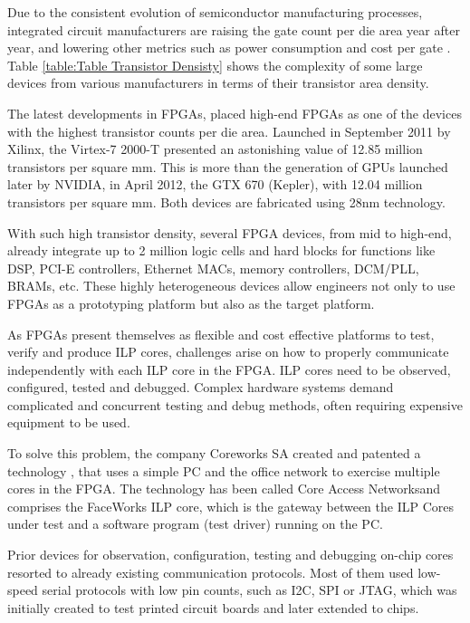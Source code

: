 \documentclass[defaultstyle,10pt,master,Helvetica]{thesis}
\begin{document}
Due to the consistent evolution of semiconductor manufacturing processes, integrated circuit manufacturers are raising the gate count per die area year after year, and lowering other metrics such as power consumption and cost per gate \cite[p. 24]{XilinxConsump}. Table \ref{table:Table Transistor Densisty} shows the complexity of some large devices from various manufacturers in terms of their transistor area density.

The latest developments in \acfp{FPGA}, placed high-end \acsp{FPGA} as one of the devices with the highest transistor counts per die area. Launched in September 2011 by Xilinx, the Virtex-7 2000-T presented an astonishing value of 12.85 million transistors per square mm. This is more than the generation of \acp{GPU} launched later by NVIDIA, in April 2012, the GTX 670 (Kepler), with 12.04 million transistors per square mm. Both devices are fabricated using 28nm technology.



With such high transistor density, several \ac{FPGA} devices, from mid to high-end, already integrate up to 2 million logic cells and hard blocks for functions like DSP, PCI-E controllers, Ethernet \acp{MAC}, memory controllers, DCM/PLL, BRAMs, etc. These highly heterogeneous devices allow engineers not only to use \acp{FPGA} as a prototyping platform but also as the target platform.

As \acp{FPGA} present themselves as flexible and cost effective platforms to test, verify and produce \acs{ILP} cores, challenges arise on how to properly communicate independently with each \acs{ILP} core in the \ac{FPGA}. \acs{ILP} cores need to be observed, configured, tested and debugged. Complex hardware systems demand complicated and concurrent testing and debug methods, often requiring expensive equipment to be used.
\clearpage

To solve this problem, the company Coreworks SA created and patented a technology \cite[US 2008/0288652]{ncapat}, \cite[EP 2003571/A2]{ncapateu} that uses a simple PC and the office network to exercise multiple cores in the \ac{FPGA}. The technology has been called Core Access Networks\textregistered and comprises the FaceWorks \acs{ILP} core, which is the gateway between the \acs{ILP} Cores under test and a software program (test driver) running on the PC. 

Prior devices for observation, configuration, testing and debugging on-chip cores resorted to already existing communication protocols. Most of them used low-speed serial protocols with low pin counts, such as I2C, SPI or JTAG, which was initially created to test printed circuit boards and later extended to chips.
\end{document}
